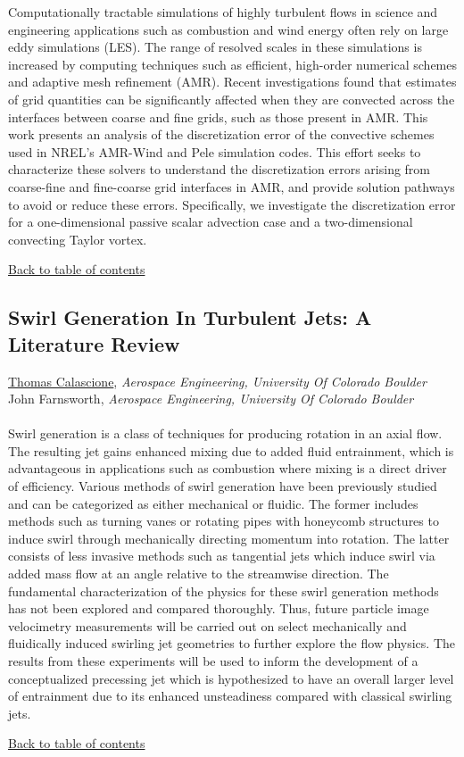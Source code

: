 \noindent Computationally tractable simulations of highly turbulent flows in science and engineering applications such as combustion and wind energy often rely on large eddy simulations (LES). The range of resolved scales in these simulations is increased by computing techniques such as efficient, high-order numerical schemes and adaptive mesh refinement (AMR). Recent investigations found that estimates of grid quantities can be significantly affected when they are convected across the interfaces between coarse and fine grids, such as those present in AMR. This work presents an analysis of the discretization error of the convective schemes used in NREL's AMR-Wind and Pele simulation codes. This effort seeks to characterize these solvers to understand the discretization errors arising from coarse-fine and fine-coarse grid interfaces in AMR, and provide solution pathways to avoid or reduce these errors. Specifically, we investigate the discretization error for a one-dimensional passive scalar advection case and a two-dimensional convecting Taylor vortex. \\ 
\begin{flushright}\vspace{-0.2 in}\hyperlink{toc}{Back to table of contents}\end{flushright}\vspace{-0.2 in}
\hypertarget{ThomasCalascione}{\subsection*{\color{CUGOLD} Swirl Generation In Turbulent Jets: A Literature Review}} \vsp 
\underline{Thomas Calascione}, \textit{Aerospace Engineering, University Of Colorado Boulder}\\ 
{John Farnsworth}, \textit{Aerospace Engineering, University Of Colorado Boulder}\\ 
\vspace{-0.1 in} \\ 
\noindent Swirl generation is a class of techniques for producing rotation in an axial flow. The resulting jet gains enhanced mixing due to added fluid entrainment, which is advantageous in applications such as combustion where mixing is a direct driver of efficiency. Various methods of swirl generation have been previously studied and can be categorized as either mechanical or fluidic. The former includes methods such as turning vanes or rotating pipes with honeycomb structures to induce swirl through mechanically directing momentum into rotation. The latter consists of less invasive methods such as tangential jets which induce swirl via added mass flow at an angle relative to the streamwise direction. The fundamental characterization of the physics for these swirl generation methods has not been explored and compared thoroughly. Thus, future particle image velocimetry measurements will be carried out on select mechanically and fluidically induced swirling jet geometries to further explore the flow physics. The results from these experiments will be used to inform the development of a conceptualized precessing jet which is hypothesized to have an overall larger level of entrainment due to its enhanced unsteadiness compared with classical swirling jets. \\ 
\begin{flushright}\vspace{-0.2 in}\hyperlink{toc}{Back to table of contents}\end{flushright}\vspace{-0.2 in}
